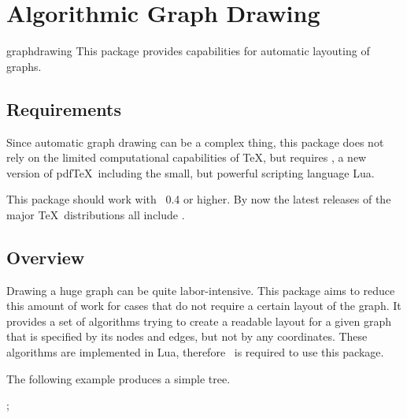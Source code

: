 %
%
%

\section{Algorithmic Graph Drawing}
{} 
\label{section-library-graphdrawing}

\begin{tikzlibrary}{graphdrawing}
This package provides capabilities for automatic layouting of graphs.
\end{tikzlibrary}

\subsection{Requirements}
Since automatic graph drawing can be a complex thing, this package does not
rely on the limited computational capabilities of \TeX, but requires \LuaTeX, a
new version of pdf\TeX\ including the small, but powerful scripting language Lua.

This package should work with \LuaTeX\ 0.4 or higher. By now
the latest releases of the major \TeX\ distributions all include \LuaTeX.

\subsection{Overview}
Drawing a huge graph can be quite labor-intensive. This package aims to reduce
this amount of work for cases that do not require a certain layout of the graph.
It provides a set of algorithms trying to create a readable layout for a given
graph that is specified by its nodes and edges, but not by any coordinates.
These algorithms are implemented in Lua, therefore \LuaTeX\ is required
to use this package.  

The following example produces a simple tree.

\begin{codeexample}[]
\tikzpicture[graph drawing=standard tree]
  ;
\endtikzpicture
\end{codeexample}


